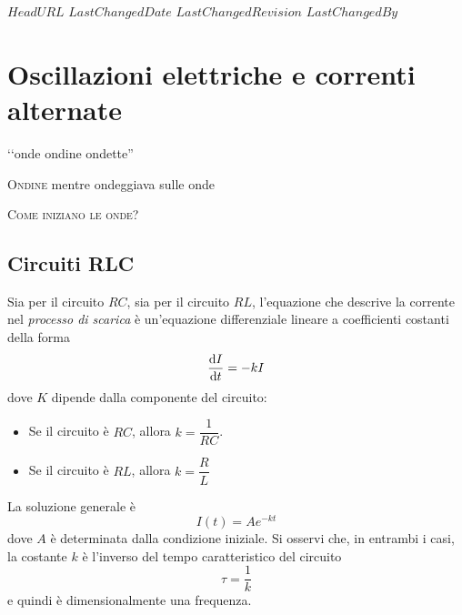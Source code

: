 \svnidlong
{$HeadURL$}
{$LastChangedDate$}
{$LastChangedRevision$}
{$LastChangedBy$}

\chapter{Oscillazioni elettriche e correnti alternate}
\begin{introduction}
	‘‘onde ondine ondette''
	\begin{flushright}
		\textsc{Ondine} mentre ondeggiava sulle onde%
	\end{flushright}
\end{introduction}
\lettrine[findent=1pt, nindent=0pt]{C}{ome iniziano le onde?} 

\section{Circuiti RLC}
\begin{observe}
	Sia per il circuito $RC$, sia per il circuito $RL$, l'equazione che descrive la corrente nel \textit{processo di scarica} è un'equazione differenziale lineare a coefficienti costanti della forma
	\begin{equation*}
		\dv{I}{t}=-kI
	\end{equation*}
	dove $K$ dipende dalla componente del circuito:
	\begin{itemize}
		\item Se il circuito è $RC$, allora $k=\dfrac{1}{RC}$.
		\item Se il circuito è $RL$, allora $k=\dfrac{R}{L}$
	\end{itemize}
	La soluzione generale è
	\begin{equation}
		I(t)=Ae^{-kt}
	\end{equation}
	dove $A$ è determinata dalla condizione iniziale. Si osservi che, in entrambi i casi, la costante $k$ è l'inverso del tempo caratteristico del circuito
	\begin{equation}
		\tau=\frac{1}{k}
	\end{equation}
	e quindi è dimensionalmente una frequenza.
\end{observe}
